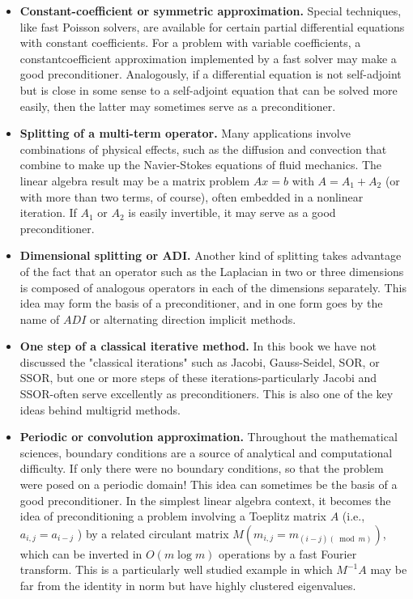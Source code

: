 \begin{itemize}
    \item \textbf{Constant-coefficient or symmetric approximation. }Special techniques, like fast Poisson solvers, are available for certain partial differential equations with constant coefficients. For a problem with variable coefficients, a constantcoefficient approximation implemented by a fast solver may make a good preconditioner. Analogously, if a differential equation is not self-adjoint but is close in some sense to a self-adjoint equation that can be solved more easily, then the latter may sometimes serve as a preconditioner.
    \item \textbf{Splitting of a multi-term operator.} Many applications involve combinations of physical effects, such as the diffusion and convection that combine to make up the Navier-Stokes equations of fluid mechanics. The linear algebra result may be a matrix problem $A x=b$ with $A=A_1+A_2$ (or with more than two terms, of course), often embedded in a nonlinear iteration. If $A_1$ or $A_2$ is easily invertible, it may serve as a good preconditioner.
    \item \textbf{Dimensional splitting or ADI.} Another kind of splitting takes advantage of the fact that an operator such as the Laplacian in two or three dimensions is composed of analogous operators in each of the dimensions separately. This idea may form the basis of a preconditioner, and in one form goes by the name of $A D I$ or alternating direction implicit methods.
    \item \textbf{One step of a classical iterative method.} In this book we have not discussed the "classical iterations" such as Jacobi, Gauss-Seidel, SOR, or SSOR, but one or more steps of these iterations-particularly Jacobi and SSOR-often serve excellently as preconditioners. This is also one of the key ideas behind multigrid methods.
    \item \textbf{Periodic or convolution approximation.} Throughout the mathematical sciences, boundary conditions are a source of analytical and computational difficulty. If only there were no boundary conditions, so that the problem were posed on a periodic domain! This idea can sometimes be the basis of a good preconditioner. In the simplest linear algebra context, it becomes the idea of preconditioning a problem involving a Toeplitz matrix $A$ (i.e., $a_{i, j}=a_{i-j}$ ) by a related circulant matrix $M\left(m_{i, j}=m_{(i-j)(\bmod m)}\right)$, which can be inverted in $O(m \log m)$ operations by a fast Fourier transform. This is a particularly well studied example in which $M^{-1} A$ may be far from the identity in norm but have highly clustered eigenvalues.

\end{itemize}
